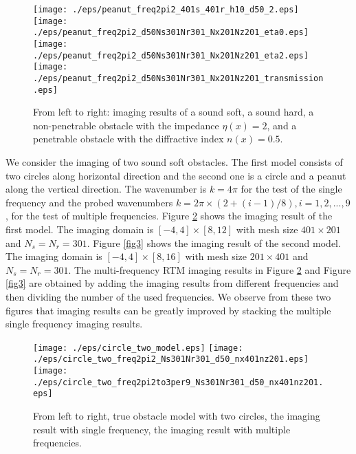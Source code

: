 \documentclass[11pt]{iopart}
\begin{document}
\begin{figure}
    \centering
    \texttt{[image: ./eps/peanut\_freq2pi2\_401s\_401r\_h10\_d50\_2.eps]}
    \texttt{[image: ./eps/peanut\_freq2pi2\_d50Ns301Nr301\_Nx201Nz201\_eta0.eps]}
    \texttt{[image: ./eps/peanut\_freq2pi2\_d50Ns301Nr301\_Nx201Nz201\_eta2.eps]}
    \texttt{[image: ./eps/peanut\_freq2pi2\_d50Ns301Nr301\_Nx201Nz201\_transmission.eps]}
    \caption{From left to right: imaging results of a sound soft, a sound hard, a non-penetrable obstacle with the impedance $\eta(x)=2$, and a penetrable obstacle with the diffractive index $n(x)=0.5$.} \label{fig1}
\end{figure}

\begin{exmp}
{\rm We consider the imaging of two sound soft obstacles. The first model consists of two circles along
horizontal direction and the second one is a circle and a peanut along the vertical direction.
The wavenumber is $k=4\pi$ for the test of the single frequency and the probed wavenumbers $k=2\pi\times(2+(i-1)/8), i=1,2,...,9$, for the test of multiple frequencies.
Figure \ref{fig2} shows the imaging result of the first model. The imaging domain is $[-4,4]\times[8,12]$
with mesh size $401\times 201$ and $N_s=N_r=301$.
Figure \ref{fig3} shows the imaging result of the second model. The imaging domain is $[-4,4]\times[8,16]$
with mesh size $201\times 401$ and $N_s=N_r=301$. The multi-frequency RTM imaging results in Figure \ref{fig2} and
Figure \ref{fig3} are obtained by adding the imaging results from different frequencies and then dividing the number of the used frequencies. 
We observe from these two figures that imaging results can be greatly improved by stacking the multiple single frequency imaging results.}
\end{exmp}

\begin{figure}
    \centering
    \texttt{[image: ./eps/circle\_two\_model.eps]}
    \texttt{[image: ./eps/circle\_two\_freq2pi2\_Ns301Nr301\_d50\_nx401nz201.eps]}
    \texttt{[image: ./eps/circle\_two\_freq2pi2to3per9\_Ns301Nr301\_d50\_nx401nz201.eps]}
    \caption{From left to right, true obstacle model with two circles, the imaging result with single frequency,
    the imaging result with multiple frequencies.}\label{fig2}
\end{figure}
\end{document}
